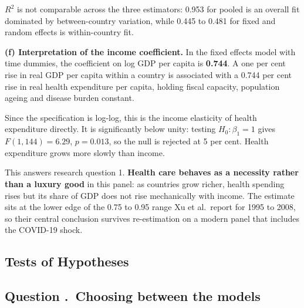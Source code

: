\documentclass[11pt,a4paper]{article}
\newcounter{qnum}
\newcommand{\question}[1]{\subsection*{Question \stepcounter{qnum}\theqnum.\ #1}}
\begin{document}
$R^2$ is not comparable across the three estimators: 0.953 for pooled is an
overall fit dominated by between-country variation, while 0.445 to 0.481 for
fixed and random effects is within-country fit.

\textbf{(f) Interpretation of the income coefficient.} In the fixed effects
model with time dummies, the coefficient on log GDP per capita is \textbf{0.744}.
A one per cent rise in real GDP per capita within a country is associated with a
0.744 per cent rise in real health expenditure per capita, holding fiscal
capacity, population ageing and disease burden constant.

Since the specification is log-log, this is the income elasticity of health
expenditure directly. It is significantly below unity: testing
$H_0 : \beta_1 = 1$ gives $F(1,144) = 6.29$, $p = 0.013$, so the null is
rejected at 5 per cent. Health expenditure grows more slowly than income.

This answers research question 1. \textbf{Health care behaves as a necessity
rather than a luxury good} in this panel: as countries grow richer, health
spending rises but its share of GDP does not rise mechanically with income. The
estimate sits at the lower edge of the 0.75 to 0.95 range Xu et al.\ report for
1995 to 2008, so their central conclusion survives re-estimation on a modern
panel that includes the COVID-19 shock.

\subsection{Tests of Hypotheses}

\question{Choosing between the models}
\end{document}
